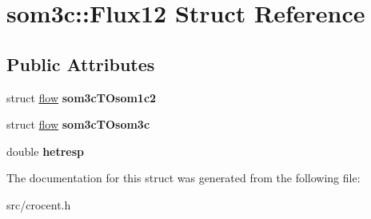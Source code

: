 \hypertarget{structsom3c_1_1_flux12}{\section{som3c\-:\-:Flux12 Struct Reference}
\label{structsom3c_1_1_flux12}
}
\subsection*{Public Attributes}
\begin{DoxyCompactItemize}
\item 
\hypertarget{structsom3c_1_1_flux12_a3f2e96b6fc647a0565d97812596a7a67}{struct \hyperlink{structflow}{flow} {\bfseries som3c\-T\-Osom1c2}}\label{structsom3c_1_1_flux12_a3f2e96b6fc647a0565d97812596a7a67}

\item 
\hypertarget{structsom3c_1_1_flux12_a875b3e50315817c6a958bfd25bf8946a}{struct \hyperlink{structflow}{flow} {\bfseries som3c\-T\-Osom3c}}\label{structsom3c_1_1_flux12_a875b3e50315817c6a958bfd25bf8946a}

\item 
\hypertarget{structsom3c_1_1_flux12_a6896ee519bd2149979d70af4e23923c6}{double {\bfseries hetresp}}\label{structsom3c_1_1_flux12_a6896ee519bd2149979d70af4e23923c6}

\end{DoxyCompactItemize}


The documentation for this struct was generated from the following file\-:\begin{DoxyCompactItemize}
\item 
src/crocent.\-h\end{DoxyCompactItemize}
